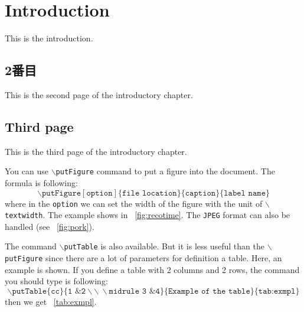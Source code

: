 \chapter{Introduction}
This is the introduction. 
\newpage
\section{2番目}
This is the second page of the introductory chapter. 
\newpage
\section{Third page}
This is the third page of the introductory chapter.

You can use \texttt{$\backslash$putFigure} command to put a figure into the document. 
The formula is following: 
\begin{equation}
\backslash\texttt{putFigure}[\texttt{option}]\{\texttt{file location}\}
\{\texttt{caption}\}\{\texttt{label name}\}
\end{equation}
where in the \texttt{option} we can set the width of the figure with the unit of \texttt{$\backslash$textwidth}. 
The example shows in \figurename~\ref{fig:recotime}. 
The \texttt{JPEG} format can also be handled (see \figurename~\ref{fig:pork}). 

The command \texttt{$\backslash$putTable} is also available. 
But it is less useful than the \texttt{$\backslash$putFigure} 
since there are a lot of parameters for definition a table.
Here, an example is shown. 
If you define a table with 2 columns and 2 rows, the command you should 
type is following: 
\begin{equation}
\backslash\texttt{putTable}\{\texttt{cc}\}
\{\texttt{1 \& 2}\backslash\backslash\ \backslash\texttt{midrule 3 \& 4}\}
\{\texttt{Example of the table}\}\{\texttt{tab:exmpl}\}
\end{equation}
then we get \tablename~\ref{tab:exmpl}. 


